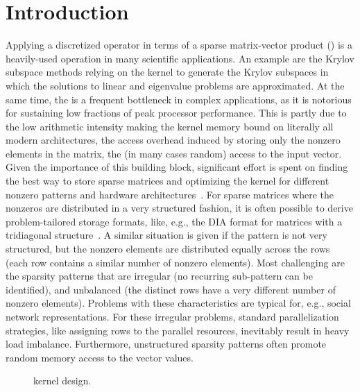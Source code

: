 \section{Introduction}
\label{2017-coo-spmv:s1-intro}
Applying a discretized operator
in terms of a sparse matrix-vector product (\spmv)
is a heavily-used operation in many scientific applications.
An example are the Krylov subspace methods relying on the \spmv kernel
to generate the Krylov subspaces in which the solutions
to linear and eigenvalue problems are approximated.
At the same time, the \spmv is a frequent bottleneck in complex applications,
as it is notorious for sustaining low fractions of peak processor performance.
This is partly due to the low arithmetic intensity making the 
\spmv kernel memory bound on literally all modern architectures,
the access overhead induced by storing only the nonzero elements in the matrix,
the (in many cases random) access to the input vector.
Given the importance of this building block,
significant effort is spent on finding the best way to store
sparse matrices and optimizing the \spmv kernel for
different nonzero patterns and hardware architectures~\cite{garlandspmv,sellpreport,Liu:2015:CES:2751205.2751209}.
For sparse matrices where the nonzeros are distributed in a very 
structured fashion, it is often possible to derive problem-tailored 
storage formats, like, e.g., the DIA format for matrices with a tridiagonal structure~\cite{garlandspmv}.
A similar situation is given if the pattern is not very structured, but the nonzero elements 
are distributed equally across the rows (each row contains 
a similar number of nonzero elements). 
Most challenging are the 
sparsity patterns that are irregular (no recurring sub-pattern can be identified),
and unbalanced (the distinct rows have a very different number of nonzero elements).
Problems with these characteristics are typical for, e.g., social network representations.
For these irregular problems, standard parallelization strategies, 
like assigning rows to the parallel resources,
inevitably result in heavy load imbalance.
Furthermore, unstructured sparsity patterns often promote 
random memory access to the vector values.

\begin{figure}
\begin{minipage}{\columnwidth}

\end{minipage}
\caption{\coo \spmv kernel design.}
\label{2017-coo-spmv:fig:spmv}
\end{figure}

